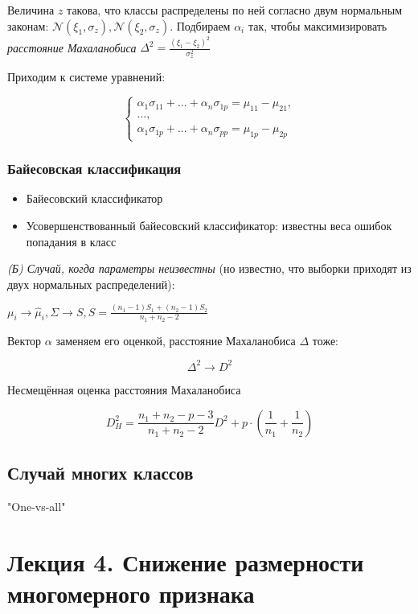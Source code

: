 \documentclass[main.tex]{subfiles}
\begin{document}
Величина $ z $ такова, что классы распределены по ней согласно двум нормальным законам: $ \mathcal{N}(\xi_1, \sigma_z), \mathcal{N}(\xi_2, \sigma_z) $.
Подбираем $ \alpha_i $ так, чтобы максимизировать \emph{расстояние Махаланобиса} $ \Delta^2 = \frac{(\xi_1 - \xi_2)^2}{\sigma_z^2} $

Приходим к системе уравнений:

\[
\begin{cases}
\alpha_1 \sigma_{11} + ... + \alpha_n \sigma_{1p} = \mu_{11} - \mu_{21}, \\
...,\\
\alpha_1 \sigma_{1p} + ... + \alpha_n \sigma_{pp} = \mu_{1p} - \mu_{2p}
\end{cases}
\]

\subsubsection{Байесовская классификация}

\begin{itemize}[noitemsep]
	\item Байесовский классификатор
	\item Усовершенствованный байесовский классификатор: известны веса ошибок попадания в класс
\end{itemize}

\emph{(Б) Случай, когда параметры неизвестны} (но известно, что выборки приходят из двух нормальных распределений):

$ \mu_i \to \hat \mu_i, \Sigma \to S, S = \frac{(n_1 - 1) S_1 + (n_2 - 1) S_2}{n_1 + n_2 - 2} $

Вектор $ \alpha $ заменяем его оценкой, расстояние Махаланобиса $\Delta$ тоже:

$$ \Delta^2 \to D^2 $$

Несмещённая оценка расстояния Махаланобиса

$$ D^2_H = \frac{n_1 + n_2 - p - 3}{n_1 + n_2 - 2} D^2 + p \cdot \left(\frac{1}{n_1} + \frac{1}{n_2}\right) $$

\subsection{Случай многих классов}

"One-vs-all"

\section{Лекция 4. Снижение размерности многомерного признака}
\end{document}
